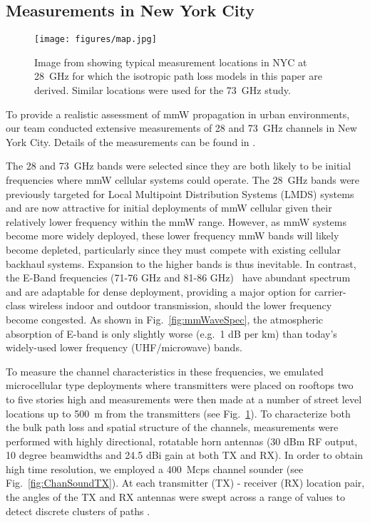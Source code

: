 \documentclass[journal]{IEEEtran}
\begin{document}
\subsection{Measurements in New York City} \label{sec:chanMeas28}

\begin{figure}
  \centering
  \texttt{[image: figures/map.jpg]}
  \caption{\label{fig:mapMeas} Image from \cite{Rappaport:12-28G}
  showing typical measurement locations in NYC at 28~GHz
  for which the isotropic path  loss models in this paper are derived. Similar locations
  were used for the 73~GHz study.}
\end{figure}

To provide a realistic assessment of mmW propagation in urban environments,
our team conducted extensive measurements of 28 and 73~GHz
channels in New York City.
Details of the measurements  can be found in
\cite{ben2011millimeter,Rappaport:12-28G,Rappaport:28NYCPenetrationLoss,Samimi:AoAD,Nie72G-PIMRC:13,Rappaport:13-BBmmW,rappaportmillimeter,Rappaport-72GHz:13}.

The 28 and 73~GHz bands were selected since they are both likely to be
initial frequencies where mmW cellular systems could operate.
The 28~GHz bands were previously targeted for Local Multipoint Distribution
Systems (LMDS) systems and are now attractive
for initial deployments of mmW cellular given
their relatively lower frequency within the mmW range.
However, as mmW systems become more widely deployed,
these lower frequency mmW bands
will likely become depleted, particularly since they must
compete with existing cellular backhaul systems.
Expansion to the higher bands is thus inevitable.
In contrast, the E-Band frequencies (71-76 GHz and 81-86 GHz)~\cite{wells:09}
have abundant spectrum and
are adaptable for dense deployment, providing a major option
for carrier-class wireless indoor and outdoor transmission, should the lower
frequency become congested.
As shown in Fig.~\ref{fig:mmWaveSpec}, the atmospheric absorption of
E-band is only slightly worse (e.g.\ 1 dB per km)
than today's widely-used lower frequency (UHF/microwave) bands.

To measure the channel characteristics in these frequencies,
we emulated microcellular type deployments where
transmitters were placed on rooftops
two to five stories high and measurements were then made at a
number of street level locations up to 500~m from the transmitters
(see Fig.~\ref{fig:mapMeas}).
To characterize both the bulk path loss and spatial structure of the
channels, measurements
were performed with highly directional, rotatable horn antennas (30 dBm RF output,
10 degree beamwidths and 24.5 dBi gain at both TX and RX).
In order to obtain high time resolution, we employed a 400~Mcps channel sounder
(see Fig.~\ref{fig:ChanSoundTX}).
At each transmitter (TX) - receiver (RX) location pair, the angles of the TX and RX antennas
were swept across a range of values to detect discrete clusters of paths
\cite{ben2011millimeter,Rappaport:12-28G,Rappaport:28NYCPenetrationLoss,Samimi:AoAD,Nie72G-PIMRC:13,Rappaport:13-BBmmW,rappaportmillimeter,Rappaport-72GHz:13}.
\end{document}
